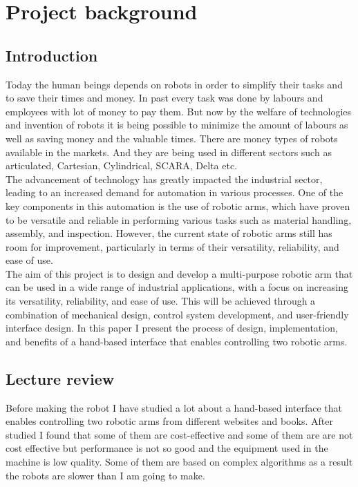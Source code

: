 \section{Project background}
\subsection{Introduction}
Today the human beings depends on robots in order to simplify their tasks and to save their times and money. In past every task was done by labours and employees with lot of money to pay them. But now by the welfare of technologies and invention of robots it is being possible to minimize the amount of labours as well as saving money and the valuable times. There are money types of robots available in the markets. And they are being used in different sectors such as articulated, Cartesian, Cylindrical, SCARA, Delta etc.\\
The advancement of technology has greatly impacted the industrial sector, leading to an increased demand for automation in various processes. One of the key components in this automation is the use of robotic arms, which have proven to be versatile and reliable in performing various tasks such as material handling, assembly, and inspection. However, the current state of robotic arms still has room for improvement, particularly in terms of their versatility, reliability, and ease of use.\\
The aim of this project is to design and develop a multi-purpose robotic arm that can be used in a wide range of industrial applications, with a focus on increasing its versatility, reliability, and ease of use. This will be achieved through a combination of mechanical design, control system development, and user-friendly interface design. In this paper I present the process of  design, implementation, and benefits of a hand-based interface that enables controlling two robotic arms.
\subsection{Lecture review}
Before making the robot I have studied a lot about a hand-based interface that enables controlling two robotic arms from different websites and books. After studied I found that some of them are cost-effective and some of them are are not cost effective but performance is not so good and the equipment used in the machine is low quality. Some of them are based on complex algorithms as a result the robots are slower than I am going to make.\\


